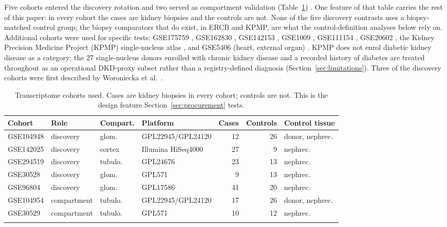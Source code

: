 \documentclass[pdflatex,sn-vancouver-num]{sn-jnl}
\theoremstyle{thmstyleone}
\theoremstyle{thmstyletwo}
\theoremstyle{thmstylethree}
\begin{document}
Five cohorts entered the discovery rotation and two served as compartment validation
(Table~\ref{tab:cohorts}) \cite{woroniecka2011,pan2018,grayson2018,fan2019,jin2026}. One feature of that table carries the rest of this paper:
in every cohort the cases are kidney biopsies and the controls are not. None of the five
discovery contrasts uses a biopsy-matched control group; the biopsy comparators that do exist, in
ERCB and KPMP, are what the control-definition analyses below rely on. Additional cohorts
were used for specific tests: GSE175759 \cite{park2022}, GSE162830 \cite{eadon2021}, GSE142153 \cite{sur2021}, GSE1009 \cite{baelde2004}, GSE111154 \cite{sircar2018}, GSE20602 \cite{neusser2010}, the
Kidney Precision Medicine Project (KPMP) single-nucleus atlas \cite{elachkar2021,lake2023}, and GSE5406
(heart, external organ) \cite{hannenhalli2006}. KPMP does not enrol diabetic kidney disease as a category; the 27 single-nucleus donors enrolled with chronic kidney disease and a recorded history of diabetes are treated throughout as an operational DKD-proxy subset rather than a registry-defined diagnosis (Section~\ref{sec:limitations}). Three of the discovery cohorts were first described by Woroniecka et
al.\ \cite{woroniecka2011}.

\begin{table}[h]
\caption{Transcriptome cohorts used. Cases are kidney biopsies in every cohort; controls are not. This is the design feature Section~\ref{sec:procurement} tests.}\label{tab:cohorts}
\footnotesize
\setlength{\tabcolsep}{4pt}
\begin{tabular}{@{}llllrrl@{}}
\toprule
Cohort & Role & Compart. & Platform & Cases & Controls & Control tissue \\
\midrule
GSE104948 & discovery & glom. & GPL22945/GPL24120 & 12 & 26 & donor, nephrec. \\
GSE142025 & discovery & cortex & Illumina HiSeq4000 & 27 & 9 & nephrec. \\
GSE294519 & discovery & tubulo. & GPL24676 & 23 & 13 & nephrec. \\
GSE30528 & discovery & glom. & GPL571 & 9 & 13 & nephrec. \\
GSE96804 & discovery & glom. & GPL17586 & 41 & 20 & nephrec. \\
GSE104954 & compartment & tubulo. & GPL22945/GPL24120 & 17 & 26 & donor, nephrec. \\
GSE30529 & compartment & tubulo. & GPL571 & 10 & 12 & nephrec. \\
\botrule
\end{tabular}
\end{table}
\end{document}
